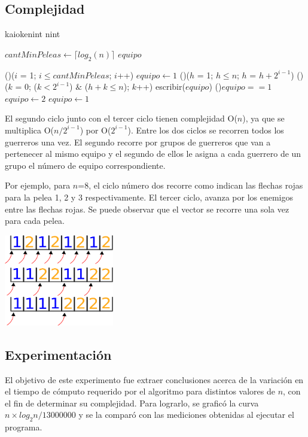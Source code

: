     \subsection{Complejidad}

    \begin{algoritmo}{kaioken}{int n}{int}

   $cantMinPeleas \gets \lceil log_{2}(n) \rceil$ 
   $equipo$ 

  \For(){($i$ = 1; $i \leq cantMinPeleas$; $i$++)}{
    $equipo \gets 1$ 
    \For(){($h$ = 1; $h \leq n$; $h$ = $h + 2^{i-1}$)}{
      \For(){($k$ = 0; ($k < 2^{i-1}$) $\&$ ($h+k \leq n$); $k$++)}{
        escribir($equipo$) 
      }
        \eIf(){$equipo == 1$}{
          $equipo \gets 2$ \;
        }{
          $equipo \gets 1$ \;
        }
    }
  }


\end{algoritmo}

El segundo ciclo junto con el tercer ciclo tienen complejidad O($n$), ya que se multiplica O($n/2^{i-1}$) por O($2^{i-1}$). Entre los dos ciclos se recorren todos los guerreros una vez. El segundo recorre por grupos de guerreros que van a pertenecer al mismo equipo y el segundo de ellos le asigna a cada guerrero de un grupo el número de equipo correspondiente. 

Por ejemplo, para $n$=8, el ciclo número dos recorre como indican las flechas rojas para la pelea 1, 2 y 3 respectivamente. El tercer ciclo, avanza por los enemigos entre las flechas rojas. Se puede observar que el vector se recorre una sola vez para cada pelea. 


\includegraphics[height=4cm]{graficos/ciclo.png}




    \subsection{Experimentación}
		El objetivo de este experimento fue extraer conclusiones acerca de la variación en el tiempo de cómputo requerido por el algoritmo para distintos valores de $n$, con el fin de determinar su complejidad. 
    Para lograrlo, se graficó la curva $n \times log_{2}n / 13000000$ y se la comparó con las mediciones obtenidas al ejecutar el programa.

